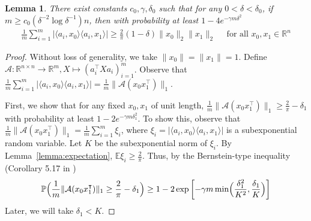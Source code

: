\documentclass[12pt]{article}
\newcommand{\1}{\mathbf{1}}
\newcommand{\R}{\mathbb{R}}
\newcommand{\A}{\mathcal{A}}
\newcommand{\PP}{\mathbb{P}}
\newtheorem{lemma}[theorem]{Lemma}
\begin{document}
\begin{lemma}  \label{lemma:lower-bound}
There exist constants $c_0, \gamma, \delta_0$ such that for any $0<\delta < \delta_0$, if $m \geq c_0 (\delta^{-2} \log \delta^{-1}) n$, then with probability at least $1-4e^{-\gamma m \delta^2}$
\begin{align}
\frac{1}{m} \sum_{i=1}^m | \langle a_i , x_0 \rangle \langle a_i,  x_1 \rangle| \geq \frac{2}{\pi} (1-\delta) \| x_0\|_2 \|x_1\|_2 \quad \text{ for all } x_0, x_1 \in \R^n \label{eq:lower-bound}
\end{align}
\end{lemma}
\begin{proof} 
Without loss of generality, we take $\|x_0\| = \|x_1\| = 1$. 
Define $\A: \R^{n \times n} \to \R^m, X \mapsto (a_i^\intercal X a_i)_{i=1}^m$.  Observe
 that $\frac{1}{m} \sum_{i=1}^m | \langle a_i, x_0\rangle \langle a_i, x_1\rangle| = \frac{1}{m}\| \mathcal{A}(x_0 x_1^\intercal) \|_1$.  
 
First, we show that for any fixed $x_0, x_1$ of unit length, 
$\frac{1}{m} \| \A(x_0 x_1^\intercal)\|_1 \geq \frac{2}{\pi} - \delta_1$
with probability at least $1 - 2 e^{-\gamma m \delta_1^2}$.  To show this, observe that $\frac{1}{m}\|\A(x_0 x_1^\intercal)\|_1 = \frac{1}{m} \sum_{i=1}^m \xi_i$, where $\xi_i =| \langle a_i, x_0\rangle \langle a_i, x_1\rangle| $ is a subexponential random variable.  Let $K$ be the subexponential norm of $\xi_i$.  By Lemma~\ref{lemma:expectation}, $\mathbb{E} \xi_i \geq \frac{2}{\pi}$.     Thus, by the Bernstein-type inequality (Corollary 5.17 in \cite{V2012}) 
$$
\PP\Bigl( \frac{1}{m} \| \A(x_0 x_1^\intercal)\|_1 \geq \frac{2}{\pi} - \delta_1 \Bigr) \geq 1- 2 \exp \left[- \gamma m \min \Bigl(\frac{\delta_1^2}{K^2}, \frac{\delta_1}{K} \Bigr) \right]
$$
Later, we will take $\delta_1 < K$. 


\end{proof}
\end{document}
